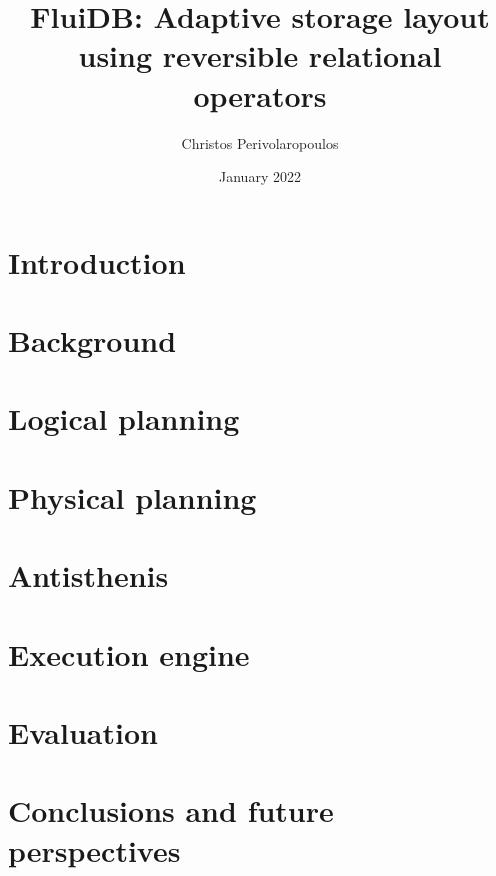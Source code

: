 \documentclass[fontsize=12pt,paper=letter,twosided,cleardoublepage=plain,final]{scrbook}
\title{FluiDB: Adaptive storage layout using reversible relational operators}
\author{Christos Perivolaropoulos}
\date{January 2022}
\begin{document}
\frontmatter


\mainmatter

\chapter{Introduction}
\label{chapter:introduction}


\chapter{Background}
\label{chapter:background}


\chapter{Logical planning}
\label{chapter:fluidb_logical_planning}


\chapter{Physical planning}
\label{chapter:physical_planning}


\chapter{Antisthenis}
\label{chapter:antisthenis}


\chapter{Execution engine}
\label{chapter:execution_engine}


\chapter{Evaluation}
\label{chapter:evaluation}


\chapter{Conclusions and future perspectives}
\label{chapter:conclusion}


% 

\begin{spacing}{1}
\printbibliography
\end{spacing}

\backmatter
\end{document}
